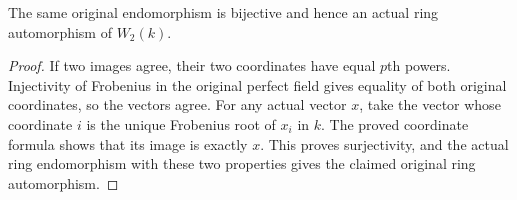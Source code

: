 \begin{theorem}
\label{thm:witt-two-frobenius-equivalence}
\leanok
{}
The same original endomorphism is bijective and
hence an actual ring automorphism of $W_2(k)$.
\end{theorem}
\begin{proof}
If two images agree, their two coordinates have
equal $p$th powers. Injectivity of Frobenius in
the original perfect field gives equality of both
original coordinates, so the vectors agree.
For any actual vector $x$, take the vector whose
coordinate $i$ is the unique Frobenius root of
$x_i$ in $k$. The proved coordinate formula shows
that its image is exactly $x$. This proves
surjectivity, and the actual ring endomorphism
with these two properties gives the claimed
original ring automorphism.
\end{proof}
